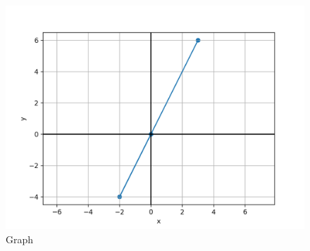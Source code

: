 \documentclass[12pt]{article}
\begin{document}
\begin{center}
\end{center}

\begin{figure}[h!]
    \centering
    \includegraphics[width=0.65\linewidth]{figs/fig.png}
    \caption{Graph}
\end{figure}
\end{document}
